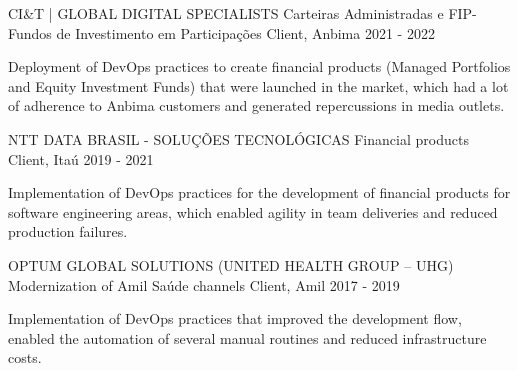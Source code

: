 

\begin{cventries}

  \cventry
    {CI\&T | GLOBAL DIGITAL SPECIALISTS} %
    {Carteiras Administradas e FIP-Fundos de Investimento em Participações} %
    {Client, Anbima} %
    {2021 - 2022} %
    {
      \begin{cvitems} %
        \item {Deployment of DevOps practices to create financial products (Managed Portfolios and Equity Investment Funds) that were launched in the market, which had a lot of adherence to Anbima customers and generated repercussions in media outlets.}
      \end{cvitems}
    }

  \cventry
    {NTT DATA BRASIL - SOLUÇÕES TECNOLÓGICAS} %
    {Financial products} %
    {Client, Itaú} %
    {2019 - 2021} %
    {
      \begin{cvitems} %
        \item {Implementation of DevOps practices for the development of financial products for software engineering areas, which enabled agility in team deliveries and reduced production failures.}
      \end{cvitems}
    }

  \cventry
    {OPTUM GLOBAL SOLUTIONS (UNITED HEALTH GROUP – UHG)} %
    {Modernization of Amil Saúde channels} %
    {Client, Amil} %
    {2017 - 2019} %
    {
      \begin{cvitems} %
        \item {Implementation of DevOps practices that improved the development flow, enabled the automation of several manual routines and reduced infrastructure costs.}
      \end{cvitems}
}

\end{cventries}
